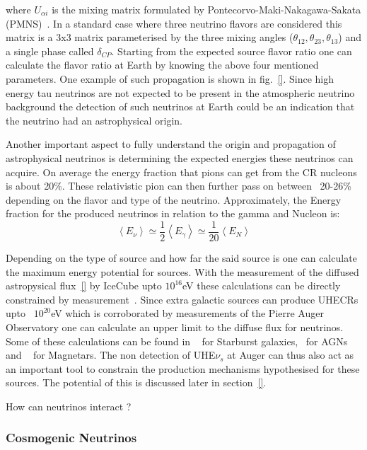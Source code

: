 where $U_{\alpha i}$ is the mixing matrix formulated by Pontecorvo-Maki-Nakagawa-Sakata (PMNS)~\cite{}. In a standard case where three neutrino flavors are considered this matrix is a 3x3 matrix parameterised by the three mixing angles ($\theta_{12},\theta_{23},\theta_{13}$) and a single phase called $\delta_{CP}$. Starting from the expected source flavor ratio one can calculate the flavor ratio at Earth by knowing the above four mentioned parameters. One example of such propagation is shown in fig.~\ref{}. Since high energy tau neutrinos are not expected to be present in the atmospheric neutrino background the detection of such neutrinos at Earth could be an indication that the neutrino had an astrophysical origin. 

Another important aspect to fully understand the origin and propagation of astrophysical neutrinos is determining the expected energies these neutrinos can acquire. On average the energy fraction that pions can get from the CR nucleons is about 20\%. These relativistic pion can then further pass on between ~20-26\% depending on the flavor and type of the neutrino. Approximately, the Energy fraction for the produced neutrinos in relation to the gamma and Nucleon is:
\begin{equation}
  \left\langle E_{\nu} \right\rangle  \simeq  \frac{1}{2}\left\langle E_{\gamma} \right\rangle \simeq  \frac{1}{20}\left\langle E_{N} \right\rangle
  \end{equation}

Depending on the type of source and how far the said source is one can calculate the maximum energy potential for sources. With the measurement of the diffused astropysical flux~\ref{} by IceCube upto $10^{16}$eV these calculations can be directly constrained by measurement~\cite{}. Since extra galactic sources can produce UHECRs upto ~$10^{20}$eV which is corroborated by measurements of the Pierre Auger Observatory one can calculate an upper limit to the diffuse flux for neutrinos. Some of these calculations can be found in ~\cite{} for Starburst galaxies, ~\cite{}for AGNs and ~\cite{} for Magnetars. The non detection of UHE$\nu_s$ at Auger can thus also act as an important tool to constrain the production mechanisms hypothesised for these sources. The potential of this is discussed later in section~\ref{}.   


How can neutrinos interact ? 

\subsubsection*{Cosmogenic Neutrinos}
\label{subsubsec:CosmoNu}

